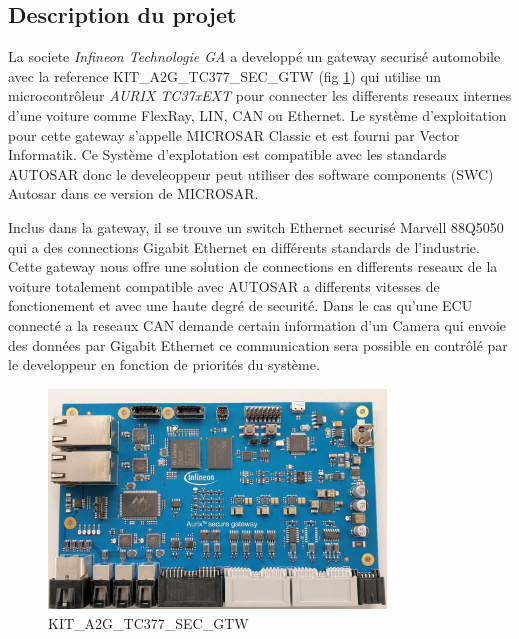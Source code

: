 \subsection{Description du projet}
La societe \textit{Infineon Technologie GA} a developp\'e un gateway securis\'e automobile avec la reference KIT\_A2G\_TC377\_SEC\_GTW \cite{gateway} (fig \ref{fig:gw-photo}) qui utilise un microcontr\^oleur \textit{AURIX TC37xEXT} pour connecter les differents reseaux internes d'une voiture comme FlexRay, LIN, CAN ou Ethernet. Le syst\`eme d'exploitation pour cette gateway s'appelle MICROSAR Classic \cite{vector.microsar} et est fourni par Vector Informatik. Ce Syst\`eme d'explotation est compatible avec les standards AUTOSAR donc le develeoppeur peut utiliser des software components (SWC) Autosar dans ce version de MICROSAR.

Inclus dans la gateway, il se trouve un switch Ethernet securis\'e Marvell 88Q5050 qui a des connections Gigabit Ethernet en différents standards de l'industrie. Cette gateway nous offre une solution de connections en differents reseaux de la voiture totalement compatible avec AUTOSAR a differents vitesses de fonctionement et avec une haute degré de securit\'e. Dans le cas qu'une ECU connect\'e a la reseaux CAN demande certain information d'un Camera qui envoie des donn\'ees par Gigabit Ethernet ce communication sera possible en contr\^ol\'e par le developpeur en fonction de priorit\'es du syst\`eme.


\begin{figure}[!htb]
 \centering
 \includegraphics[width=0.8\textwidth]{img/secure-gateway.jpg}
 \caption{KIT\_A2G\_TC377\_SEC\_GTW}
 \label{fig:gw-photo}
\end{figure}

